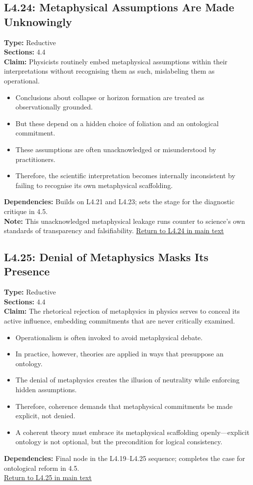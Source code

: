 \documentclass[12pt]{book}
\newcommand{\returnlink}[1]{\hyperref[logic:#1]{Return to #1 in main text}\xspace}
\begin{document}
\subsection*{L4.24: Metaphysical Assumptions Are Made Unknowingly}
\label{appendix:L4.24}
\textbf{Type:} Reductive \\
\textbf{Sections:} 4.4 \\
\textbf{Claim:} Physicists routinely embed metaphysical assumptions within their interpretations without recognising them as such, mislabeling them as operational.
\begin{itemize}
  \item Conclusions about collapse or horizon formation are treated as observationally grounded.
  \item But these depend on a hidden choice of foliation and an ontological commitment.
  \item These assumptions are often unacknowledged or misunderstood by practitioners.
  \item Therefore, the scientific interpretation becomes internally inconsistent by failing to recognise its own metaphysical scaffolding.
\end{itemize}
\textbf{Dependencies:} Builds on L4.21 and L4.23; sets the stage for the diagnostic critique in 4.5.\\
\textbf{Note:} This unacknowledged metaphysical leakage runs counter to science's own standards of transparency and falsifiability.
\returnlink{L4.24}

\subsection*{L4.25: Denial of Metaphysics Masks Its Presence}
\label{appendix:L4.25}
\textbf{Type:} Reductive \\
\textbf{Sections:} 4.4 \\
\textbf{Claim:} The rhetorical rejection of metaphysics in physics serves to conceal its active influence, embedding commitments that are never critically examined.
\begin{itemize}
  \item Operationalism is often invoked to avoid metaphysical debate.
  \item In practice, however, theories are applied in ways that presuppose an ontology.
  \item The denial of metaphysics creates the illusion of neutrality while enforcing hidden assumptions.
  \item Therefore, coherence demands that metaphysical commitments be made explicit, not denied.
  \item A coherent theory must embrace its metaphysical scaffolding openly---explicit ontology is not optional, but the precondition for logical consistency.
\end{itemize}
\textbf{Dependencies:} Final node in the L4.19–L4.25 sequence; completes the case for ontological reform in 4.5.\\
\returnlink{L4.25}
\end{document}
